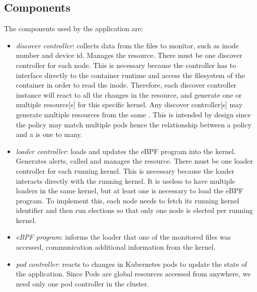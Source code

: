 \subsection{Components}

The components used by the application are:

\begin{itemize}

  \item \textit{discover controller}: collects data from the files to monitor,
    such as inode number and device id. Manages the  resource.
    There must be one discover controller for each node. This is necessary
    because the controller has to interface directly to the container runtime
    and access the filesystem of the container in order to read the inode.
    Therefore, each discover controller instance will react to all the changes
    in the  resource, and generate one or multiple
     resource[s] for this specific kernel. Any discover
    controller[s] may generate multiple  resources from the same
    . This is intended by design since the policy may match
    multiple pods hence the relationship between a policy and a 
    is one to many.

  \item \textit{loader controller}: loads and updates the eBPF program into the
    kernel. Generates alerts, called  and manages the
     resource. There must be one loader controller for each
    running kernel. This is necessary because the loader interacts directly with
    the running kernel. It is useless to have multiple loaders in the same
    kernel, but at least one is necessary to load the eBPF program. To implement
    this, each node needs to fetch its running kernel identifier and then run
    elections so that only one node is elected per running kernel.

  \item \textit{eBPF program}: informs the loader that one of the monitored
    files was accessed, communication additional information from the kernel.

  \item \textit{pod controller}: reacts to changes in Kubernetes pods to update
    the state of the application. Since Pods are global resources accessed from
    anywhere, we need only one pod controller in the cluster.

\end{itemize}

